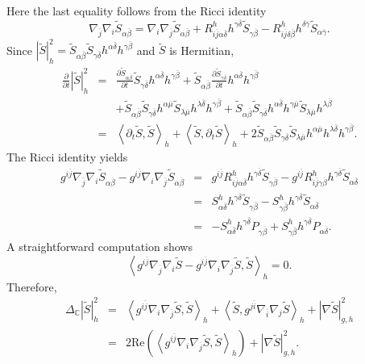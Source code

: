 \documentclass[12pt, reqno]{amsart}
\theoremstyle{plain}
\theoremstyle{definition}
\newcommand{\p}{\partial}
\renewcommand{\bar}{\overline}
\newcommand{\beq}{\begin{equation}}
\newcommand{\eeq}{\end{equation}}
\renewcommand{\tilde}{\widetilde}
\renewcommand{\>}{\rightarrow}
\newcommand{\C}{{\mathbb C}}
\newcommand{\LL}{\left\langle}
\newcommand{\RL}{\right\rangle}
\renewcommand{\>}{\rightarrow}
\renewcommand{\p}{{\partial}}
\renewcommand{\bar}{\overline}
\renewcommand{\tilde}{\widetilde}
\numberwithin{equation}{section} %
\begin{document}
Here  the last equality follows from the Ricci identity
\beq
\nabla_{\bar j}\nabla_i\tilde S_{\alpha\bar\beta}
=
\nabla_i\nabla_{\bar j}\tilde S_{\alpha\bar\beta}
+
R^{h}_{i\bar j\alpha\bar\delta}
h^{\gamma\bar\delta}\tilde S_{\gamma\bar\beta}
-
R^{h}_{i\bar j\delta\bar\beta}
h^{\delta\bar\gamma}\tilde S_{\alpha\bar\gamma}.
\eeq
Since $|\tilde S|_{h}^2=\tilde S_{\alpha\bar\beta}\tilde S_{\gamma\bar\delta} h^{\alpha\bar\delta}h^{\gamma\bar\beta}$ and $\tilde S$ is Hermitian,
\begin{eqnarray}
\frac{\p}{\p t}|\tilde S|_{h}^2
&=&  \frac{\p \tilde S_{\alpha\bar\beta}}{\p t} \tilde S_{\gamma\bar\delta} h^{\alpha\bar\delta}h^{\gamma\bar\beta}
+ \tilde S_{\alpha\bar\beta}  \frac{\p \tilde S_{\gamma\bar\delta}}{\p t}  h^{\alpha\bar\delta}h^{\gamma\bar\beta} \nonumber\\
&&+  \tilde S_{\alpha\bar\beta}\tilde S_{\gamma\bar\delta} h^{\alpha\bar \mu} \tilde S_{\lambda\bar \mu} h^{\lambda\bar \delta} h^{\gamma\bar\beta}
+ \tilde S_{\alpha\bar\beta}\tilde S_{\gamma\bar\delta} h^{\alpha\bar\delta} h^{\gamma\bar \mu}\tilde S_{\lambda\bar \mu} h^{\lambda\bar\beta}\nonumber\\
&=& \LL \p_t \tilde S,\tilde S\RL_{h} +\LL \tilde S,\p_t \tilde S\RL_{h} +
2 \tilde S_{\alpha\bar\beta}\tilde S_{\gamma\bar\delta}\tilde S_{\lambda\bar \mu} h^{\alpha\bar \mu}  h^{\lambda\bar \delta} h^{\gamma\bar\beta}.
\label{time derivative of tilde S norm}
\end{eqnarray}
 The Ricci identity yields
\begin{eqnarray}
g^{i\bar j}\nabla_{\bar j}\nabla_{i}\tilde S_{\alpha\bar\beta}
- g^{i\bar j}\nabla_i\nabla_{\bar j}\tilde S_{\alpha\bar\beta}
&=&  g^{i\bar j}R^{h}_{i\bar j\alpha\bar\delta}h^{\gamma\bar\delta} \tilde S_{\gamma\bar\beta}
-g^{i\bar j}R^{h}_{i\bar j\gamma\bar\beta}h^{\gamma\bar\delta} \tilde S_{\alpha\bar\delta}\nonumber\\
&=& S^{h}_{\alpha\bar\delta}h^{\gamma\bar\delta} \tilde S_{\gamma\bar\beta}
- S^{h}_{\gamma\bar\beta}h^{\gamma\bar\delta} \tilde S_{\alpha\bar\delta}\nonumber\\
&=& - S^{h}_{\alpha\bar\delta}h^{\gamma\bar\delta} P_{\gamma\bar\beta}
+S^{h}_{\gamma\bar\beta}h^{\gamma\bar\delta} P_{\alpha\bar\delta}.
\label{Ricci identity for tilde S}
\end{eqnarray}
A straightforward computation shows
\beq
\LL g^{i\bar j}\nabla_{\bar j}\nabla_{i}\tilde S
- g^{i\bar j}\nabla_i\nabla_{\bar j}\tilde S,\tilde S\RL_h=0.
\eeq
Therefore,
\begin{eqnarray}
\Delta_{\C}|\tilde S|_{h}^2
&=&   \LL g^{i\bar j}\nabla_i\nabla_{\bar j}\tilde S,\tilde S\RL_{h}
+\LL \tilde S,g^{j\bar i}\nabla_{\bar i}\nabla_j\tilde S\RL_{h} + \left|\nabla \tilde S\right|_{g,h}^2\nonumber\\
&=&   2\mathrm{Re}\left(\LL g^{i\bar j}\nabla_i\nabla_{\bar j}\tilde S,\tilde S\RL_{h}\right)
+ \left|\nabla \tilde S\right|_{g,h}^2.
\label{Laplacian tilde S norm}
\end{eqnarray}
\end{document}
